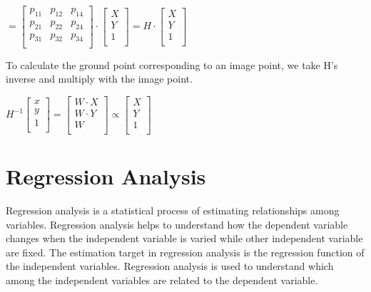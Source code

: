 \documentclass[a4paper]{aitthesis}
\begin{document}
 \begin{center}
 \large
$= \begin{bmatrix}
p_{11} & p_{12} & p_{14} \\
p_{21} & p_{22} & p_{24} \\
p_{31} & p_{32} & p_{34}\\
\end{bmatrix} \cdot
\begin{bmatrix}
X\\
Y\\
1\\
\end{bmatrix}
 = H\cdot\begin{bmatrix}
X\\
Y\\
1\\
\end{bmatrix}$
 \end{center}
 To calculate the ground point corresponding to an image point, we take H's inverse and multiply with the image point.
 \begin{center}
 \large
 $ H^{-1} 
 \begin{bmatrix}
x\\
y\\
1\\
 \end{bmatrix}=
 \begin{bmatrix}
 W\cdot X\\
W\cdot Y\\
 W \\
 \end{bmatrix} \propto
 \begin{bmatrix}
 X\\
 Y\\
 1\\
 \end{bmatrix}$
 \end{center}

\section{Regression Analysis}
Regression analysis is a statistical  process of estimating relationships among variables. Regression analysis helps to understand how the dependent variable changes when the independent variable is varied while other independent variable are fixed. The estimation target in regression analysis is the regression  function of the independent variables. Regression analysis is used to understand which among the independent variables are related to the dependent variable. 
\end{document}
